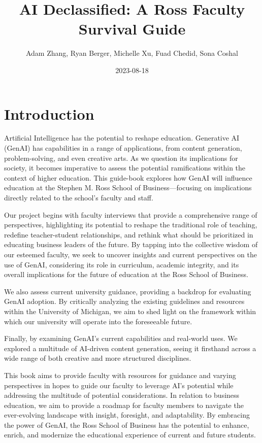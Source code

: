 \documentclass[
]{book}
\title{AI Declassified: A Ross Faculty Survival Guide}
\author{Adam Zhang, Ryan Berger, Michelle Xu, Fuad Chedid, Sona Coshal}
\date{2023-08-18}
\begin{document}
\maketitle

{
\setcounter{tocdepth}{1}
\tableofcontents
}
\hypertarget{introduction}{%
\chapter{Introduction}\label{introduction}}

Artificial Intelligence has the potential to reshape education. Generative AI (GenAI) has capabilities in a range of applications, from content generation, problem-solving, and even creative arts. As we question its implications for society, it becomes imperative to assess the potential ramifications within the context of higher education. This guide-book explores how GenAI will influence education at the Stephen M. Ross School of Business---focusing on implications directly related to the school's faculty and staff.

Our project begins with faculty interviews that provide a comprehensive range of perspectives, highlighting its potential to reshape the traditional role of teaching, redefine teacher-student relationships, and rethink what should be prioritized in educating business leaders of the future. By tapping into the collective wisdom of our esteemed faculty, we seek to uncover insights and current perspectives on the use of GenAI, considering its role in curriculum, academic integrity, and its overall implications for the future of education at the Ross School of Business.

We also assess current university guidance, providing a backdrop for evaluating GenAI adoption. By critically analyzing the existing guidelines and resources within the University of Michigan, we aim to shed light on the framework within which our university will operate into the foreseeable future.

Finally, by examining GenAI's current capabilities and real-world uses. We explored a multitude of AI-driven content generation, seeing it firsthand across a wide range of both creative and more structured disciplines.

This book aims to provide faculty with resources for guidance and varying perspectives in hopes to guide our faculty to leverage AI's potential while addressing the multitude of potential considerations. In relation to business education, we aim to provide a roadmap for faculty members to navigate the ever-evolving landscape with insight, foresight, and adaptability. By embracing the power of GenAI, the Ross School of Business has the potential to enhance, enrich, and modernize the educational experience of current and future students.
\end{document}
